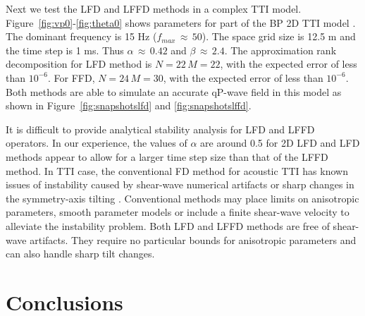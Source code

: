 {

Next we test the LFD and LFFD methods in a complex TTI model.
Figure~\ref{fig:vp0}-\ref{fig:theta0} shows parameters for part of the BP 2D TTI model \cite[]{bptti}.
The dominant frequency is 15 Hz ($f_{max}\,\approx\,50$). 
The space grid size is 12.5 m and the time step is 1 ms.
Thus $\alpha\,\approx\,0.42$ and $\beta\,\approx\,2.4$. 
The approximation
rank decomposition for LFD method is $N=22\, M=22$, with the expected error of
less than $10^{-6}$. 
For FFD, $N=24\, M=30$, with the expected error of
less than $10^{-6}$.
Both methods are able to simulate an accurate qP-wave field in this model as shown in Figure~\ref{fig:snapshotslfd} and \ref{fig:snapshotslffd}.


It is difficult to provide analytical stability analysis for LFD and LFFD operators. 
In our experience, the values of $\alpha$ are around 0.5 for 2D LFD and LFD methods appear to allow for a larger time step size than that of the LFFD method.
In TTI case, the conventional FD method for acoustic TTI has known issues of instability caused by shear-wave numerical artifacts or sharp changes in the symmetry-axis tilting \cite[]{grechkat,zhang2,duveneckt}.
Conventional methods may place limits on anisotropic parameters, smooth parameter models or include a finite shear-wave velocity to alleviate the instability problem\cite[]{yoon,zhang3,fletcher}.
Both LFD and LFFD methods are free of shear-wave artifacts. 
They require no particular bounds for anisotropic parameters and can also handle sharp tilt changes.
 
\section{Conclusions}

}

